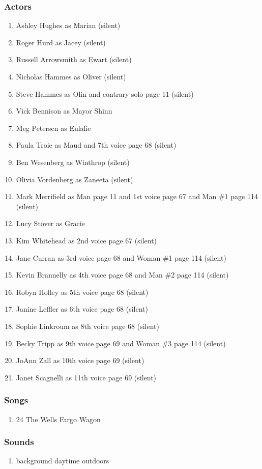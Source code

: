 \subsubsection{Actors}
\begin{enumerate}
\item Ashley Hughes as Marian (silent)
\item Roger Hurd as Jacey (silent)
\item Russell Arrowsmith as Ewart (silent)
\item Nicholas Hammes as Oliver (silent)
\item Steve Hammes as Olin and contrary solo page 11 (silent)
\item Vick Bennison as Mayor Shinn
\item Meg Petersen as Eulalie
\item Paula Troie as Maud and 7th voice page 68 (silent)
\item Ben Wesenberg as Winthrop (silent)
\item Olivia Vordenberg as Zaneeta (silent)
\item Mark Merrifield as Man page 11 and 1st voice page 67 and Man \#1 page 114 (silent)
\item Lucy Stover as Gracie
\item Kim Whitehead as 2nd voice page 67 (silent)
\item Jane Curran as 3rd voice page 68 and Woman \#1 page 114 (silent)
\item Kevin Brannelly as 4th voice page 68 and Man \#2 page 114 (silent)
\item Robyn Holley as 5th voice page 68 (silent)
\item Janine Leffler as 6th voice page 68 (silent)
\item Sophie Linkroum as 8th voice page 68 (silent)
\item Becky Tripp as 9th voice page 69 and Woman \#3 page 114 (silent)
\item JoAnn Zall as 10th voice page 69 (silent)
\item Janet Scagnelli as 11th voice page 69 (silent)
\end{enumerate}

\subsubsection{Songs}
\begin{enumerate}
\item 24 The Wells Fargo Wagon
\end{enumerate}\subsubsection{Sounds}
\begin{enumerate}
\item background daytime outdoors
\end{enumerate}
